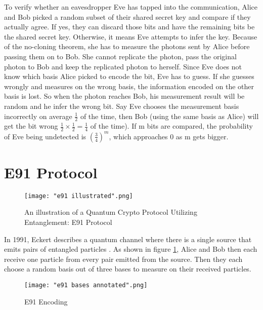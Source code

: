 To verify whether an eavesdropper Eve has tapped into the communication, Alice and Bob picked a random subset of their shared secret key and compare if they actually agree. If yes, they can discard those bits and have the remaining bits be the shared secret key. Otherwise, it means Eve attempts to infer the key. Because of the no-cloning theorem, she has to measure the photons sent by Alice before passing them on to Bob. She cannot replicate the photon, pass the original photon to Bob and keep the replicated photon to herself. Since Eve does not know which basis Alice picked to encode the bit, Eve has to guess. If she guesses wrongly and measures on the wrong basis, the information encoded on the other basis is lost. So when the photon reaches Bob, his measurement result will be random and he infer the wrong bit. Say Eve chooses the measurement basis incorrectly on average $\frac{1}{2}$ of the time, then Bob (using the same basis as Alice) will get the bit wrong $\frac{1}{2} \times \frac{1}{2}=\frac{1}{4}$ of the time). If m bits are compared, the probability of Eve being undetected is $(\frac{3}{4})^m$, which approaches 0 as m gets bigger.

\pagebreak


\section{E91 Protocol} \label{section: e91}
\begin{figure}[h]
    \centering
    \texttt{[image: "e91 illustrated".png]}
    \caption{An illustration of a Quantum Crypto Protocol Utilizing Entanglement: E91 Protocol \protect\footnotemark}
    \label{fig:E91 Illustrated}
\end{figure}
In 1991, Eckert describes a quantum channel where there is a single source that emits pairs of entangled particles \cite{Ekert1991}. As shown in figure \ref{fig:E91 Illustrated}, Alice and Bob then each receive one particle from every pair emitted from the source. Then they each choose a random basis out of three bases to measure on their received particles. 

\begin{figure}[h]
    \centering
    \texttt{[image: "e91 bases annotated".png]}
    \caption{E91 Encoding}
    \label{fig:e91 encoding}
\end{figure}

